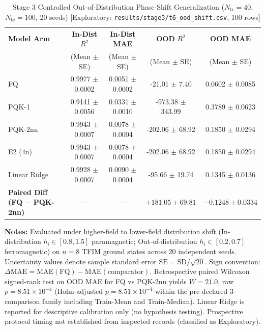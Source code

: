\begin{table}[!t]
\caption{Stage 3 Controlled Out-of-Distribution Phase-Shift Generalization ($N_{\mathrm{tr}}=40$, $N_{\mathrm{te}}=100$, 20 seeds) [Exploratory: \texttt{results/stage3/t6\_ood\_shift.csv}, 100 rows]}
\label{tab:ood}
\centering
\begingroup
\small
\setlength{\tabcolsep}{5pt}
\begin{tabular}{@{}lcccc@{}}
\toprule
\textbf{Model Arm} & \textbf{In-Dist} $R^2$ & \textbf{In-Dist MAE} & \textbf{OOD} $R^2$ & \textbf{OOD MAE} \\
 & (Mean $\pm$ SE) & (Mean $\pm$ SE) & (Mean $\pm$ SE) & (Mean $\pm$ SE) \\
\midrule
FQ & 0.9977 $\pm$ 0.0002 & 0.0051 $\pm$ 0.0002 & -21.01 $\pm$ 7.40 & 0.0602 $\pm$ 0.0085 \\
PQK-1 & 0.9141 $\pm$ 0.0056 & 0.0331 $\pm$ 0.0010 & -973.38 $\pm$ 343.99 & 0.3789 $\pm$ 0.0623 \\
PQK-2nn & 0.9943 $\pm$ 0.0007 & 0.0078 $\pm$ 0.0004 & -202.06 $\pm$ 68.92 & 0.1850 $\pm$ 0.0294 \\
E2 (4n) & 0.9943 $\pm$ 0.0007 & 0.0078 $\pm$ 0.0004 & -202.06 $\pm$ 68.92 & 0.1850 $\pm$ 0.0294 \\
Linear Ridge & 0.9928 $\pm$ 0.0007 & 0.0090 $\pm$ 0.0004 & -95.66 $\pm$ 19.74 & 0.1345 $\pm$ 0.0136 \\
\midrule
\textbf{Paired Diff (FQ $-$ PQK-2nn)} & --- & --- & $+181.05 \pm 69.81$ & $-0.1248 \pm 0.0334$ \\
\bottomrule
\end{tabular}
\endgroup
\vspace{1ex}
{\raggedright \footnotesize \textbf{Notes:} Evaluated under higher-field to lower-field distribution shift (In-distribution $h_i \in [0.8, 1.5]$ paramagnetic; Out-of-distribution $h_i \in [0.2, 0.7]$ ferromagnetic) on $n=8$ TFIM ground states across 20 independent seeds. Uncertainty values denote sample standard error $\mathrm{SE} = \mathrm{SD}/\sqrt{20}$. Sign convention: $\Delta\mathrm{MAE} = \mathrm{MAE}(\mathrm{FQ}) - \mathrm{MAE}(\mathrm{comparator})$. Retrospective paired Wilcoxon signed-rank test on OOD MAE for FQ vs PQK-2nn yields $W=21.0$, raw $p=8.51\times 10^{-4}$ (Holm-adjusted $p=8.51\times 10^{-4}$ within the pre-declared 3-comparison family including Train-Mean and Train-Median). Linear Ridge is reported for descriptive calibration only (no hypothesis testing). Prospective protocol timing not established from inspected records (classified as Exploratory).\par}
\end{table}
